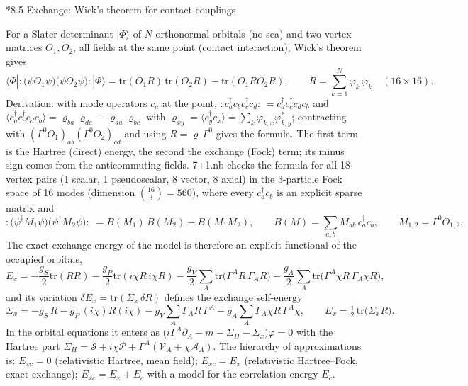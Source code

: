 \documentclass[10pt,a4paper]{article}
\makeatletter
\renewcommand\subsection{\@startsection{subsection}{2}{\z@}{-3.25ex\@plus -1ex \@minus -.2ex}{1.5ex \@plus .2ex}{\normalfont\large\bfseries\raggedright}}
\makeatother
\begin{document}
\subsection*{8.5 Exchange: Wick’s theorem for contact couplings}
For a Slater determinant $|\Phi\rangle$ of $N$ orthonormal orbitals (no sea) and two vertex matrices $O_1,O_2$, all fields at the same point (contact interaction), Wick’s theorem gives
\begin{equation*}
\langle\Phi|:\big(\bar\psi O_1\psi\big)\big(\bar\psi O_2\psi\big):|\Phi\rangle=\mathrm{tr}(O_1R)\,\mathrm{tr}(O_2R)-\mathrm{tr}(O_1RO_2R),\qquad R=\sum_{k=1}^{N}\varphi_k\,\bar\varphi_k\quad(16\times16).
\end{equation*}
Derivation: with mode operators $c_a$ at the point, $:\!c_a^\dagger c_bc_c^\dagger c_d\!:\,=c_a^\dagger c_c^\dagger c_dc_b$ and $\langle c_a^\dagger c_c^\dagger c_dc_b\rangle=\varrho_{ba}\varrho_{dc}-\varrho_{da}\varrho_{bc}$ with $\varrho_{xy}=\langle c_y^\dagger c_x\rangle=\sum_k\varphi_{k,x}\varphi_{k,y}^*$; contracting with $(\Gamma^0O_1)_{ab}(\Gamma^0O_2)_{cd}$ and using $R=\varrho\,\Gamma^0$ gives the formula. The first term is the Hartree (direct) energy, the second the exchange (Fock) term; its minus sign comes from the anticommuting fields. 7+1.nb checks the formula for all 18 vertex pairs (1 scalar, 1 pseudoscalar, 8 vector, 8 axial) in the 3-particle Fock space of 16 modes (dimension $\binom{16}{3}=560$), where every $c_a^\dagger c_b$ is an explicit sparse matrix and
\begin{equation*}
:\big(\psi^\dagger M_1\psi\big)\big(\psi^\dagger M_2\psi\big):\;=B(M_1)\,B(M_2)-B(M_1M_2),\qquad B(M)=\sum_{a,b}M_{ab}\,c_a^\dagger c_b,\qquad M_{1,2}=\Gamma^0O_{1,2}.
\end{equation*}
The exact exchange energy of the model is therefore an explicit functional of the occupied orbitals,
\begin{equation*}
E_x=-\frac{g_S}{2}\mathrm{tr}(RR)-\frac{g_P}{2}\mathrm{tr}(i\chi R\,i\chi R)-\frac{g_V}{2}\sum_A\mathrm{tr}\big(\Gamma^AR\,\Gamma_AR\big)-\frac{g_A}{2}\sum_A\mathrm{tr}\big(\Gamma^A\chi R\,\Gamma_A\chi R\big),
\end{equation*}
and its variation $\delta E_x=\mathrm{tr}(\Sigma_x\,\delta R)$ defines the exchange self-energy
\begin{equation*}
\Sigma_x=-g_S\,R-g_P\,(i\chi)R(i\chi)-g_V\sum_A\Gamma_AR\,\Gamma^A-g_A\sum_A\Gamma_A\chi R\,\Gamma^A\chi,\qquad E_x=\tfrac12\,\mathrm{tr}\big(\Sigma_xR\big).
\end{equation*}
In the orbital equations it enters as $\big(i\Gamma^A\partial_A-m-\Sigma_H-\Sigma_x\big)\varphi=0$ with the Hartree part $\Sigma_H=\mathcal S+i\chi\mathcal P+\Gamma^A(\mathcal V_A+\chi\mathcal A_A)$. The hierarchy of approximations is: $E_{xc}=0$ (relativistic Hartree, mean field); $E_{xc}=E_x$ (relativistic Hartree–Fock, exact exchange); $E_{xc}=E_x+E_c$ with a model for the correlation energy $E_c$.
\end{document}

